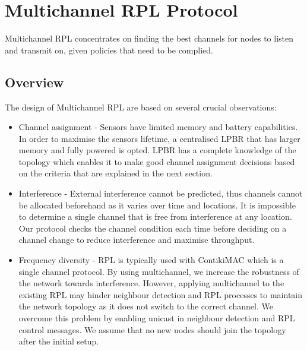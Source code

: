 \section{Multichannel RPL Protocol}
\label{sec:multichannel}
Multichannel RPL concentrates on finding the best channels for nodes to listen and transmit on, given policies that need to be complied. 

\subsection{Overview}


The design of Multichannel RPL are based on several crucial observations:

\begin{itemize}
\item Channel assignment - Sensors have limited memory and battery capabilities. In order to maximise the sensors lifetime, a centralised LPBR that has larger memory and fully powered is opted. LPBR has a complete knowledge of the topology which enables it to make good channel assignment decisions based on the criteria that are explained in the next section. 

\item Interference - External interference cannot be predicted, thus channels cannot be allocated beforehand as it varies over time and locations. It is impossible to determine a single channel that is free from interference at any location. Our protocol checks the channel condition each time before deciding on a channel change to reduce interference and maximise throughput.

\item Frequency diversity - RPL is typically used with ContikiMAC which is a single channel protocol. By using multichannel, we increase the robustness of the network towards interference. However, applying multichannel to the existing RPL may hinder neighbour detection and RPL processes to maintain the network topology as it does not switch to the correct channel. We overcome this problem by enabling unicast in neighbour detection and RPL control messages. We assume that no new nodes should join the topology after the initial setup.
\end{itemize}

